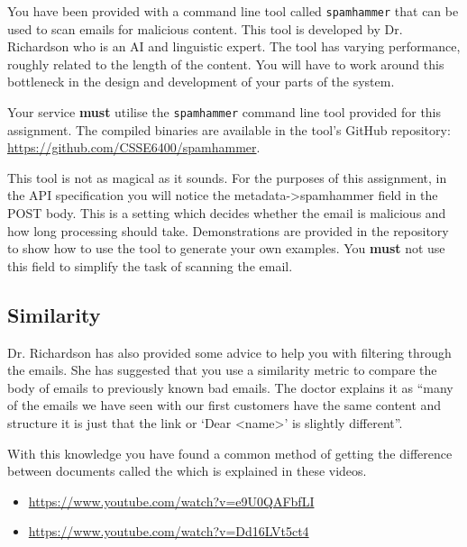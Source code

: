 \documentclass{csse4400}
\begin{document}

You have been provided with a command line tool called \texttt{spamhammer} that can be used to scan emails for malicious content.
This tool is developed by Dr. Richardson who is an AI and linguistic expert.
The tool has varying performance, roughly related to the length of the content.
You will have to work around this bottleneck in the design and development of your parts of the system.

Your service \textbf{must} utilise the \texttt{spamhammer} command line tool provided for this assignment.
The compiled binaries are available in the tool's GitHub repository: \url{https://github.com/CSSE6400/spamhammer}.


This tool is not as magical as it sounds.
For the purposes of this assignment, in the API specification you will notice the metadata->spamhammer field in the POST body.
This is a setting which decides whether the email is malicious and how long processing should take.
Demonstrations are provided in the repository to show how to use the tool to generate your own examples.
You \textbf{must} not use this field to simplify the task of scanning the email.

\subsection{Similarity}

Dr. Richardson has also provided some advice to help you with filtering through the emails.
She has suggested that you use a similarity metric to compare the body of emails to previously known bad emails.
The doctor explains it as ``many of the emails we have seen with our first customers have the same content and structure it is just that the link or `Dear <name>' is slightly different''.

With this knowledge you have found a common method of getting the difference between documents called the 
 which is explained in these videos.

\begin{itemize}
  \item \url{https://www.youtube.com/watch?v=e9U0QAFbfLI}
  \item \url{https://www.youtube.com/watch?v=Dd16LVt5ct4}
\end{itemize}
\end{document}
